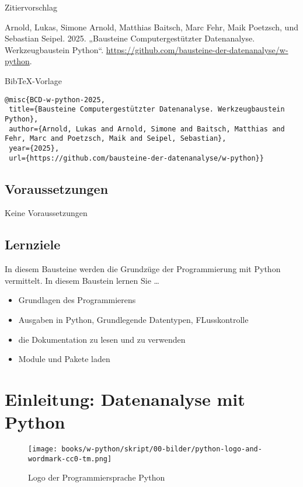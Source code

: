 \documentclass[
  letterpaper,
  DIV=11,
  numbers=noendperiod]{scrreprt}
\begin{document}
Zitiervorschlag

Arnold, Lukas, Simone Arnold, Matthias Baitsch, Marc Fehr, Maik
Poetzsch, und Sebastian Seipel. 2025. „Bausteine Computergestützter
Datenanalyse. Werkzeugbaustein Python``.
\url{https://github.com/bausteine-der-datenanalyse/w-python}.

BibTeX-Vorlage

\begin{verbatim}
@misc{BCD-w-python-2025,
 title={Bausteine Computergestützter Datenanalyse. Werkzeugbaustein Python},
 author={Arnold, Lukas and Arnold, Simone and Baitsch, Matthias and Fehr, Marc and Poetzsch, Maik and Seipel, Sebastian},
 year={2025},
 url={https://github.com/bausteine-der-datenanalyse/w-python}} 
\end{verbatim}

\section*{Voraussetzungen}\label{voraussetzungen}


Keine Voraussetzungen

\section*{Lernziele}\label{lernziele}


In diesem Bausteine werden die Grundzüge der Programmierung mit Python
vermittelt. In diesem Baustein lernen Sie \ldots{}

\begin{itemize}
\item
  Grundlagen des Programmierens
\item
  Ausgaben in Python, Grundlegende Datentypen, FLusskontrolle
\item
  die Dokumentation zu lesen und zu verwenden
\item
  Module und Pakete laden
\end{itemize}

\chapter{Einleitung: Datenanalyse mit
Python}\label{einleitung-datenanalyse-mit-python}

\begin{figure}[H]

{\centering \texttt{[image: books/w-python/skript/00-bilder/python-logo-and-wordmark-cc0-tm.png]}

}

\caption{Logo der Programmiersprache Python}

\end{figure}%
\end{document}

